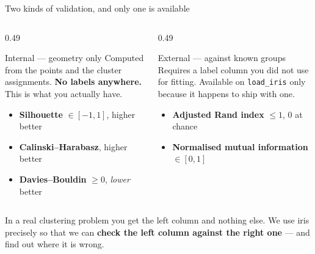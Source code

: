 \documentclass[aspectratio=169]{beamer}
\begin{document}
\begin{frame}[shrink=6]{Two kinds of validation, and only one is available}
  \begin{columns}[T]
    \begin{column}{0.49\textwidth}
      \begin{block}{Internal --- geometry only}
        Computed from the points and the cluster assignments. \textbf{No
        labels anywhere.} This is what you actually have.
        \begin{itemize}
          \item \textbf{Silhouette} $\in [-1,1]$, higher better
          \item \textbf{Calinski--Harabasz}, higher better
          \item \textbf{Davies--Bouldin} $\geq 0$, \emph{lower} better
        \end{itemize}
      \end{block}
    \end{column}
    \begin{column}{0.49\textwidth}
      \begin{alertblock}{External --- against known groups}
        Requires a label column you did not use for fitting. Available on
        \texttt{load\_iris} only because it happens to ship with one.
        \begin{itemize}
          \item \textbf{Adjusted Rand index} $\leq 1$, $0$ at chance
          \item \textbf{Normalised mutual information} $\in [0,1]$
        \end{itemize}
      \end{alertblock}
    \end{column}
  \end{columns}
  \begin{center}\small
    In a real clustering problem you get the left column and nothing else.
    We use iris precisely so that we can \textbf{check the left column
    against the right one} --- and find out where it is wrong.
  \end{center}
\end{frame}
\end{document}
